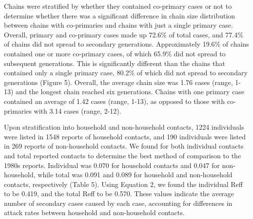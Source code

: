 Chains were stratified by whether they contained co-primary cases or not to determine whether there was a significant difference in chain size distribution between chains with co-primaries and chains with just a single primary case. Overall, primary and co-primary cases made up 72.6\% of total cases, and 77.4\% of chains did not spread to secondary generations. Approximately 19.6\% of chains contained one or more co-primary cases, of which 65.9\% did not spread to subsequent generations. This is significantly different than the chains that contained only a single primary case, 80.2\% of which did not spread to secondary generations (Figure 5). Overall, the average chain size was 1.76 cases (range, 1-13) and the longest chain reached six generations. Chains with one primary case contained an average of 1.42 cases (range, 1-13), as opposed to those with co-primaries with 3.14 cases (range, 2-12). 

Upon stratification into household and non-household contacts, 1224 individuals were listed in 1548 reports of household contacts, and 190 individuals were listed in 269 reports of non-household contacts. We found for both individual contacts and total reported contacts to determine the best method of comparison to the 1980s reports. Individual was 0.070 for household contacts and 0.047 for non-household, while total was 0.091 and 0.089 for household and non-household contacts, respectively (Table 5). Using Equation 2, we found the individual Reff to be 0.419, and the total Reff to be 0.570. These values indicate the average number of secondary cases caused by each case, accounting for differences in attack rates between household and non-household contacts.